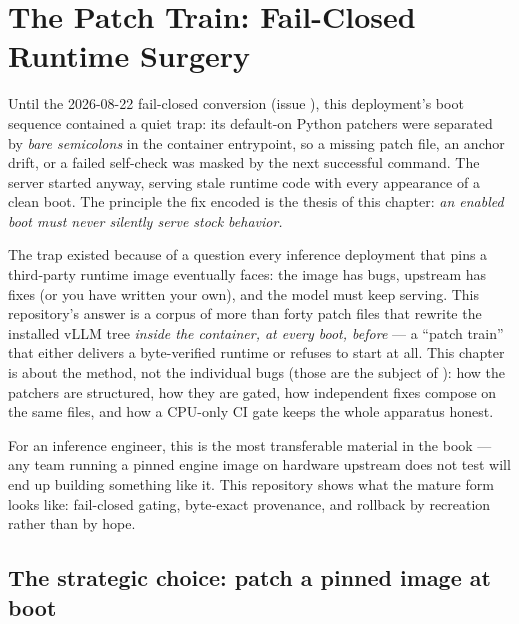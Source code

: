 
\chapter{The Patch Train: Fail-Closed Runtime Surgery}
\label{ch:patches}

Until the 2026-08-22 fail-closed conversion (issue ), this
deployment's boot sequence contained a quiet trap: its default-on Python
patchers were separated by \emph{bare semicolons} in the container
entrypoint, so a missing patch file, an anchor drift, or a failed self-check
was masked by the next successful command. The server started anyway,
serving stale runtime code with every appearance of a clean boot. The
principle the fix encoded is the thesis of this chapter: \emph{an enabled
boot must never silently serve stock behavior.}

The trap existed because of a question every inference deployment that pins a
third-party runtime image eventually faces: the image has bugs, upstream has
fixes (or you have written your own), and the model must keep serving. This
repository's answer is a corpus of more than forty patch files that rewrite
the installed vLLM tree \emph{inside the container, at every boot, before}
 --- a ``patch train'' that either delivers a
byte-verified runtime or refuses to start at all. This chapter is about the
method, not the individual bugs (those are the subject of ):
how the patchers are structured, how they are gated, how independent fixes
compose on the same files, and how a CPU-only CI gate keeps the whole
apparatus honest.

For an inference engineer, this is the most transferable material in the book
--- any team running a pinned engine image on hardware upstream does not test
will end up building something like it. This repository shows what the mature
form looks like: fail-closed gating, byte-exact provenance, and rollback by
recreation rather than by hope.

\section{The strategic choice: patch a pinned image at boot}
\label{sec:patches-strategy}

